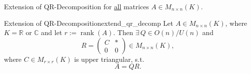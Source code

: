 Extension of QR-Decomposition for \underline{all} matrices $A \in M_{n \times n}(K)$.

\begin{theorem}{Extension of QR-Decomposition}{extend_qr_decomp}
	Let $A \in M_{n \times n}(K)$, where $K = \mathbb{R}$ or $\mathbb{C}$ and let $r := \operatorname{rank}(A)$. Then $\exists \, Q \in O(n) / U(n)$ and 
	\[
		R = \begin{pmatrix}
			C & \ast\\
			0 & 0
		\end{pmatrix} \in M_{n \times n}(K),
	\] 
	where $C \in M_{r\times r}(K)$ is upper triangular, s.t.
	\[
		A = QR.
	\]
\end{theorem}




